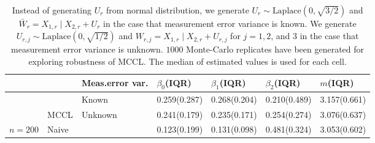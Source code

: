 \begin{table}

\caption{Instead of generating $U_{r}$ from normal distribution, we generate $U_{r} \sim \text{Laplace}\left(0, \sqrt{3/2}\right)$ and $\bar{W}_{r}=X_{1, r} \mid X_{2, r}+U_{r}$ in the case that measurement error variance is known. We generate $U_{r, j} \sim \text{Laplace}\left(0, \sqrt{1/2}\right)$ and $W_{r, j}=X_{1, r} \mid X_{2, r}+U_{r, j}$ for $j=1,2$, and $3$ in the case that measurement error variance is unknown. $1000$ Monte-Carlo replicates have been generated for exploring robustness of MCCL. The median of estimated values is used for each cell.}
\centering
\begin{tabular}[t]{lllllll}
\toprule
 &  & Meas.error var. & $\beta_0$(IQR) & $\beta_1$(IQR) & $\beta_2$(IQR) & $m$(IQR)\\
\midrule
 &  & Known & 0.259(0.287) & 0.268(0.204) & 0.210(0.489) & 3.157(0.661)\\

 & \multirow{-2}{*}{\raggedright\arraybackslash MCCL} & Unknown & 0.241(0.179) & 0.235(0.171) & 0.254(0.274) & 3.076(0.637)\\

\multirow{-3}{*}{\raggedright\arraybackslash $n=200$} & Naive &  & 0.123(0.199) & 0.131(0.098) & 0.481(0.324) & 3.053(0.602)\\
\bottomrule
\end{tabular}
\end{table}
